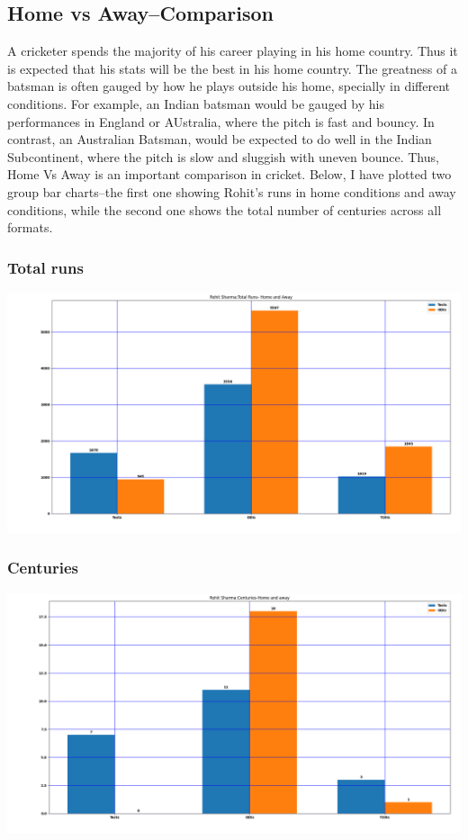 \documentclass[twoside,10pt,a4paper]{article}
\numberwithin{equation}{section}
\numberwithin{figure}{section}
\begin{document}
\subsection{Home vs Away--Comparison}
A cricketer spends the majority of his career playing in his home country. Thus it is expected that his stats will be the best in his home country. The greatness of a batsman is often gauged by how he plays outside his home, specially in different conditions. For example, an Indian batsman would be gauged by his performances in England or AUstralia, where the pitch is fast and bouncy. In contrast, an Australian Batsman, would be expected to do well in the Indian Subcontinent, where the pitch is slow and sluggish with uneven bounce.
Thus, Home Vs Away is an important comparison in cricket. Below, I have plotted two group bar charts--the first one showing Rohit's runs in home conditions and away conditions, while the second one shows the total number of centuries across all formats.
\subsubsection{Total runs}
\includegraphics[scale=0.22]{Home_away_runs.png}
\subsubsection{Centuries}
\includegraphics[scale=0.22]{Home_away_centuries.png}
\end{document}
